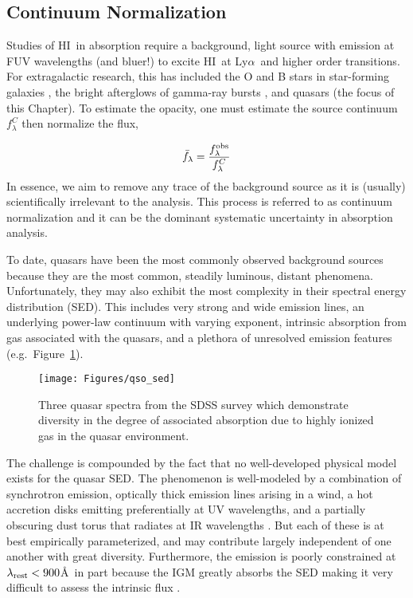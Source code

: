\documentclass[graybox]{svmult}
\newcommand{\HI}{H{\sc I}}
\def\lya{Ly$\alpha$}
\begin{document}
\subsection{Continuum Normalization}
Studies of \HI\ in absorption require a background, light source
with emission at FUV wavelengths (and bluer!) to excite \HI\
at \lya\ and higher order transitions.
For extragalactic research, this has included the O and B stars
in star-forming galaxies \cite[]{lee+14}, the bright afterglows
of gamma-ray bursts \cite[]{fjp+09}, and quasars (the focus
of this Chapter).   To estimate the opacity, one must estimate
the source continuum $f^C_\lambda$ then normalize the flux, 

\begin{equation}
\bar f_\lambda = \frac{f_\lambda^{\rm obs}}{f_\lambda^C}
\end{equation}
In essence, we aim to remove any trace of the background
source as it is (usually)
scientifically irrelevant to the analysis.
This process is referred to as continuum normalization and
it can be the dominant systematic uncertainty in absorption
analysis.

To date, quasars have been the most commonly observed background
sources because they are the most common, steadily luminous, distant
phenomena.   Unfortunately, they may also exhibit the most complexity
in their spectral energy distribution (SED).  This includes
very strong and wide emission lines, an underlying power-law
continuum with varying exponent, intrinsic absorption from gas
associated with the quasars, and a plethora of unresolved emission
features (e.g.\ Figure~\ref{fig:qso_SED}).


%
\begin{figure}[b]
\sidecaption
\texttt{[image: Figures/qso\_sed]}
%
%
\caption{Three quasar spectra from the SDSS survey
which demonstrate diversity in the degree of associated
absorption due to highly ionized gas in the quasar
environment.
}
\label{fig:qso_SED}       %
\end{figure}

The challenge is compounded by the fact that no well-developed physical
model exists for the quasar SED.  The phenomenon is well-modeled
by a combination of synchrotron emission, optically thick
emission lines arising in a wind, a hot accretion disks 
emitting preferentially at UV wavelengths, and a partially
obscuring dust torus that radiates at IR wavelengths 
\cite[e.g.][]{lusso+12}.
But each of these is at best empirically parameterized, and may
contribute largely independent of one another
with great diversity.  Furthermore, the emission is
poorly constrained at $\lambda_{\rm rest} < 900$\AA\
in part because the IGM greatly absorbs the SED
making it very difficult to assess the intrinsic flux 
\cite[see][]{lusso+15}.
\end{document}
